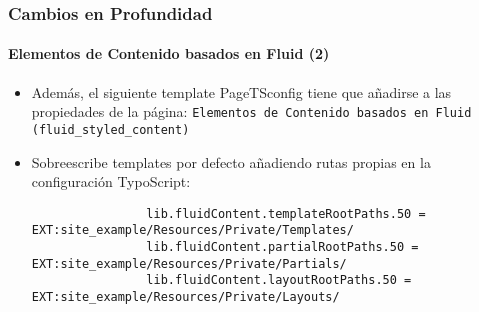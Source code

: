 \begin{frame}[fragile]
	\frametitle{Cambios en Profundidad}
	\framesubtitle{Elementos de Contenido basados en Fluid (2)}

	\lstset{basicstyle=\tiny\ttfamily}

	\begin{itemize}

		\item Además, el siguiente template PageTSconfig tiene que añadirse a las propiedades de la página:\newline
			\small
				\texttt{Elementos de Contenido basados en Fluid (fluid\_styled\_content)}
			\normalsize

		\item Sobreescribe templates por defecto añadiendo rutas propias en la configuración TypoScript:

			\begin{lstlisting}
				lib.fluidContent.templateRootPaths.50 = EXT:site_example/Resources/Private/Templates/
				lib.fluidContent.partialRootPaths.50 = EXT:site_example/Resources/Private/Partials/
				lib.fluidContent.layoutRootPaths.50 = EXT:site_example/Resources/Private/Layouts/
			\end{lstlisting}

	\end{itemize}

\end{frame}


